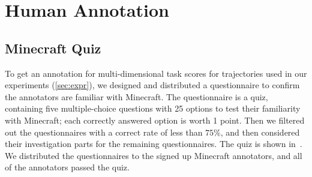 \newpage

\section{Human Annotation}

\subsection{Minecraft Quiz}

To get an annotation for multi-dimensional task scores for trajectories used in our experiments (\cref{sec:expr}), we designed and distributed a questionnaire to confirm the annotators are familiar with Minecraft. The questionnaire is a quiz, containing five multiple-choice questions with 25 options to test their familiarity with Minecraft; each correctly answered option is worth 1 point. Then we filtered out the questionnaires with a correct rate of less than $75\%$, and then considered their investigation parts for the remaining questionnaires. The quiz is shown in~. We distributed the questionnaires to the signed up Minecraft annotators, and all of the annotators passed the quiz.


